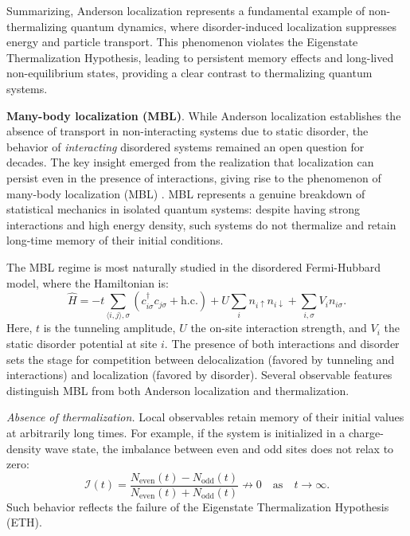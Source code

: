 Summarizing, Anderson localization represents a fundamental example of non-thermalizing quantum dynamics, where disorder-induced localization suppresses energy and particle transport. This phenomenon violates the Eigenstate Thermalization Hypothesis, leading to persistent memory effects and long-lived non-equilibrium states, providing a clear contrast to thermalizing quantum systems.



\textbf{Many-body localization (MBL)}.
While Anderson localization establishes the absence of transport in non-interacting systems due to static disorder, the behavior of \emph{interacting} disordered systems remained an open question for decades. The key insight emerged from the realization that localization can persist even in the presence of interactions, giving rise to the phenomenon of many-body localization (MBL) \cite{basko_metalinsulator_2006,nandkishore_many-body_2015,abanin_colloquium_2019}. MBL represents a genuine breakdown of statistical mechanics in isolated quantum systems: despite having strong interactions and high energy density, such systems do not thermalize and retain long-time memory of their initial conditions.

The MBL regime is most naturally studied in the disordered Fermi-Hubbard model, where the Hamiltonian is:
\begin{equation*}
\hat{H} = -t \sum_{\langle i, j \rangle, \sigma} (c^\dagger_{i \sigma} c_{j \sigma} + \text{h.c.}) + U \sum_i n_{i \uparrow} n_{i \downarrow} + \sum_{i, \sigma} V_i n_{i \sigma}.
\label{eq:fh-mbl}
\end{equation*}
Here, $t$ is the tunneling amplitude, $U$ the on-site interaction strength, and $V_i$ the static disorder potential at site $i$. The presence of both interactions and disorder sets the stage for competition between delocalization (favored by tunneling and interactions) and localization (favored by disorder). Several observable features distinguish MBL from both Anderson localization and thermalization.


\emph{Absence of thermalization.} Local observables retain memory of their initial values at arbitrarily long times. For example, if the system is initialized in a charge-density wave state, the imbalance between even and odd sites does not relax to zero:
\begin{equation*}
\mathcal{I}(t) = \frac{N_\text{even}(t) - N_\text{odd}(t)}{N_\text{even}(t) + N_\text{odd}(t)} \not\rightarrow 0 \quad \text{as} \quad t \to \infty.
\end{equation*}
Such behavior reflects the failure of the Eigenstate Thermalization Hypothesis (ETH).


